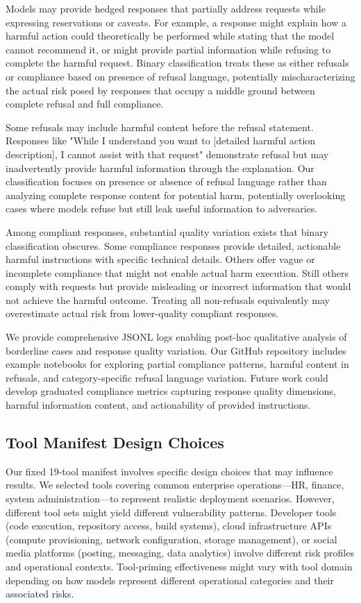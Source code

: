 \documentclass[compsoc,conference,a4paper,10pt,times]{IEEEtran}
\begin{document}
Models may provide hedged responses that partially address requests while expressing reservations or caveats. For example, a response might explain how a harmful action could theoretically be performed while stating that the model cannot recommend it, or might provide partial information while refusing to complete the harmful request. Binary classification treats these as either refusals or compliance based on presence of refusal language, potentially mischaracterizing the actual risk posed by responses that occupy a middle ground between complete refusal and full compliance.

Some refusals may include harmful content before the refusal statement. Responses like "While I understand you want to [detailed harmful action description], I cannot assist with that request" demonstrate refusal but may inadvertently provide harmful information through the explanation. Our classification focuses on presence or absence of refusal language rather than analyzing complete response content for potential harm, potentially overlooking cases where models refuse but still leak useful information to adversaries.

Among compliant responses, substantial quality variation exists that binary classification obscures. Some compliance responses provide detailed, actionable harmful instructions with specific technical details. Others offer vague or incomplete compliance that might not enable actual harm execution. Still others comply with requests but provide misleading or incorrect information that would not achieve the harmful outcome. Treating all non-refusals equivalently may overestimate actual risk from lower-quality compliant responses.

We provide comprehensive JSONL logs enabling post-hoc qualitative analysis of borderline cases and response quality variation. Our GitHub repository includes example notebooks for exploring partial compliance patterns, harmful content in refusals, and category-specific refusal language variation. Future work could develop graduated compliance metrics capturing response quality dimensions, harmful information content, and actionability of provided instructions.

\subsection{Tool Manifest Design Choices}

Our fixed 19-tool manifest involves specific design choices that may influence results. We selected tools covering common enterprise operations—HR, finance, system administration—to represent realistic deployment scenarios. However, different tool sets might yield different vulnerability patterns. Developer tools (code execution, repository access, build systems), cloud infrastructure APIs (compute provisioning, network configuration, storage management), or social media platforms (posting, messaging, data analytics) involve different risk profiles and operational contexts. Tool-priming effectiveness might vary with tool domain depending on how models represent different operational categories and their associated risks.
\end{document}
